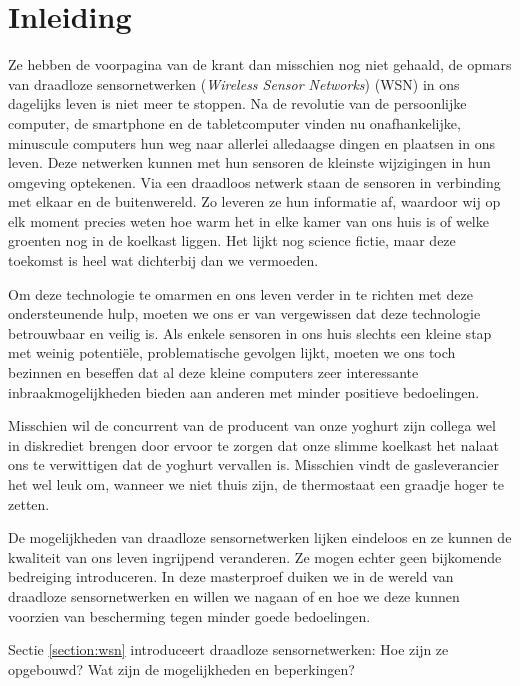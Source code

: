 
\chapter{Inleiding}
\label{inleiding}

Ze hebben de voorpagina van de krant dan misschien nog niet gehaald, de opmars
van draadloze sensornetwerken (\emph{Wireless Sensor Networks}) (WSN) in ons
dagelijks leven is niet meer te stoppen. Na de revolutie van de persoonlijke
computer, de smartphone en de tabletcomputer vinden nu onafhankelijke,
minuscule computers hun weg naar allerlei alledaagse dingen en plaatsen in ons
leven. Deze netwerken kunnen met hun sensoren de kleinste wijzigingen in hun
omgeving optekenen. Via een draadloos netwerk staan de sensoren in verbinding
met elkaar en de buitenwereld. Zo leveren ze hun informatie af, waardoor wij op
elk moment precies weten hoe warm het in elke kamer van ons huis is of welke
groenten nog in de koelkast liggen. Het lijkt nog science fictie, maar deze
toekomst is heel wat dichterbij dan we vermoeden.

Om deze technologie te omarmen en ons leven verder in te richten met deze
ondersteunende hulp, moeten we ons er van vergewissen dat deze technologie
betrouwbaar en veilig is. Als enkele sensoren in ons huis slechts een kleine
stap met weinig potenti\"ele, problematische gevolgen lijkt, moeten we ons toch
bezinnen en beseffen dat al deze kleine computers zeer interessante
inbraakmogelijkheden bieden aan anderen met minder positieve bedoelingen.

Misschien wil de concurrent van de producent van onze yoghurt zijn collega wel
in diskrediet brengen door ervoor te zorgen dat onze slimme koelkast het nalaat
ons te verwittigen dat de yoghurt vervallen is. Misschien vindt de
gasleverancier het wel leuk om, wanneer we niet thuis zijn, de thermostaat een
graadje hoger te zetten.

De mogelijkheden van draadloze sensornetwerken lijken eindeloos en ze kunnen de
kwaliteit van ons leven ingrijpend veranderen. Ze mogen echter geen bijkomende
bedreiging introduceren. In deze masterproef duiken we in de wereld van
draadloze sensornetwerken en willen we nagaan of en hoe we deze kunnen voorzien
van bescherming tegen minder goede bedoelingen.

Sectie \ref{section:wsn} introduceert draadloze sensornetwerken: Hoe zijn ze
opgebouwd? Wat zijn de mogelijkheden en beperkingen?

